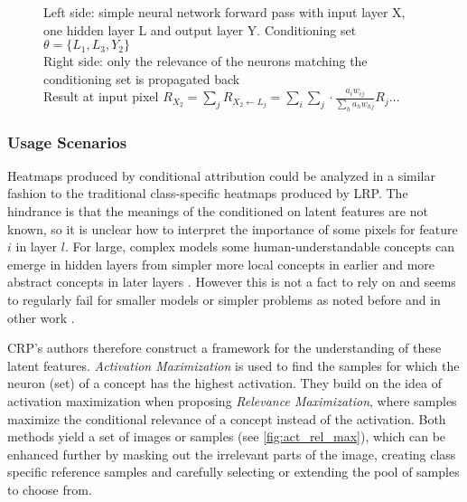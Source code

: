 \begin{figure}[htbp]

    \caption{Left side: simple neural network forward pass with input layer X, one hidden layer L and output layer Y. Conditioning set $\theta = \{L_1, L_3, Y_2\}$ \\ Right side: only the relevance of the neurons matching the conditioning set is propagated back \\
        Result at input pixel $R_{X_2} = \sum_{j}  R_{X_2 \gets L_j} =  \sum_i \sum_{j} \cdot \frac{a_i w_{ij}}{\sum_h a_h w_{hj}} R_j \dots$ }
    \label{fig:crp_example_condition}
\end{figure}

\subsubsection*{Usage Scenarios}
Heatmaps produced by conditional attribution could be analyzed in a similar fashion to the traditional class-specific heatmaps produced by LRP. The hindrance is that the meanings of the conditioned on latent features are not known, so it is unclear how to interpret the importance of some pixels for feature $i$ in layer $l$. For large, complex models some human-understandable concepts can emerge in hidden layers from simpler more local concepts in earlier and more abstract concepts in later layers \cite{Bau2017, Hohman2020, Olah2017, Bau2020}. However this is not a fact to rely on and seems to regularly fail for smaller models or simpler problems as noted before and in other work .

CRP's authors therefore construct a framework for the understanding of these latent features. \textit{Activation Maximization} is used to find the samples for which the neuron (set) of a concept has the highest activation. They build on the idea of activation maximization when proposing \textit{Relevance Maximization}, where samples maximize the conditional relevance of a concept instead of the activation. Both methods yield a set of images or samples (see \autoref{fig:act_rel_max}), which can be enhanced further by masking out the irrelevant parts of the image, creating class specific reference samples and carefully selecting or extending the pool of samples to choose from. 

